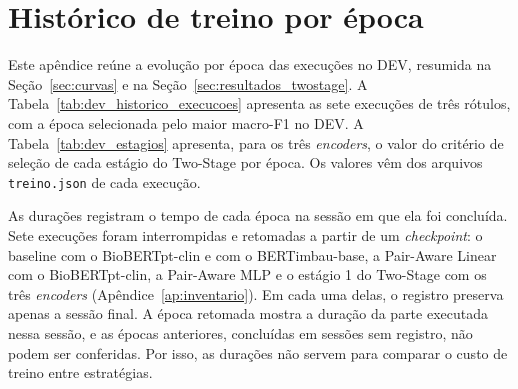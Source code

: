 \chapter[Histórico de treino por época]{Histórico de treino por época}
\label{ap:historico}

Este apêndice reúne a evolução por época das execuções no DEV, resumida na
Seção~\ref{sec:curvas} e na Seção~\ref{sec:resultados_twostage}. A
Tabela~\ref{tab:dev_historico_execucoes} apresenta as sete execuções de três rótulos,
com a época selecionada pelo maior macro-F1 no DEV. A Tabela~\ref{tab:dev_estagios}
apresenta, para os três \emph{encoders}, o valor do critério de seleção de cada
estágio do Two-Stage por época. Os valores vêm dos arquivos \texttt{treino.json} de
cada execução.

As durações registram o tempo de cada época na sessão em que ela foi concluída. Sete
execuções foram interrompidas e retomadas a partir de um \emph{checkpoint}: o baseline
com o BioBERTpt-clin e com o BERTimbau-base, a Pair-Aware Linear com o
BioBERTpt-clin, a Pair-Aware MLP e o estágio 1 do Two-Stage com os três
\emph{encoders} (Apêndice~\ref{ap:inventario}). Em cada uma delas, o registro preserva
apenas a sessão final. A época retomada mostra a duração da parte executada nessa
sessão, e as épocas anteriores, concluídas em sessões sem registro, não podem ser
conferidas. Por isso, as durações não servem para comparar o custo de treino entre
estratégias.




